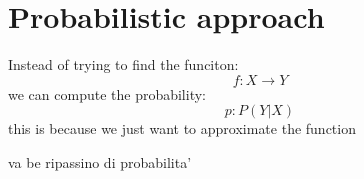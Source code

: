 % 
\chapter{Probabilistic approach}
Instead of trying to find the funciton:
\[
f: X \to Y
\]
we can compute the probability:
\[
  p: P(Y|X)
\]
this is because we just want to approximate the function

va be ripassino di probabilita'
% 
